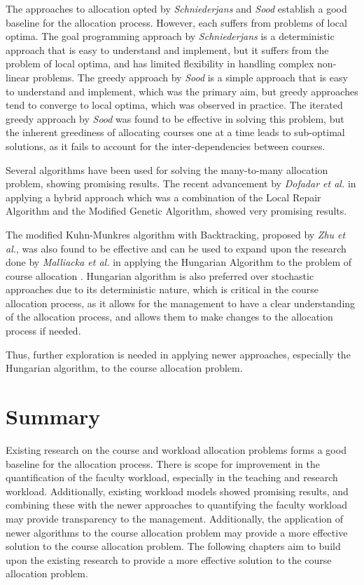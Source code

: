 The approaches to allocation opted by \textit{Schniederjans} and \textit{Sood} establish a good baseline for the allocation process. However, each suffers from problems of local optima. The goal programming approach by \textit{Schniederjans} is a deterministic approach that is easy to understand and implement, but it suffers from the problem of local optima, and has limited flexibility in handling complex non-linear problems. The greedy approach by \textit{Sood} is a simple approach that is easy to understand and implement, which was the primary aim, but greedy approaches tend to converge to local optima, which was observed in practice. The iterated greedy approach by \textit{Sood} was found to be effective in solving this problem, but the inherent greediness of allocating courses one at a time leads to sub-optimal solutions, as it fails to account for the inter-dependencies between courses.

Several algorithms have been used for solving the many-to-many allocation problem, showing promising results. The recent advancement by \textit{Dofadar et al.} in applying a hybrid approach which was a combination of the Local Repair Algorithm and the Modified Genetic Algorithm, showed very promising results.

The modified Kuhn-Munkres algorithm with Backtracking, proposed by \textit{Zhu et al.}, was also found to be effective and can be used to expand upon the research done by \textit{Malliacka et al.} in applying the Hungarian Algorithm to the problem of course allocation \cite{dofadar2021hybrid, zhu2016solving, mallicka2021claps}. Hungarian algorithm is also preferred over stochastic approaches due to its deterministic nature, which is critical in the course allocation process, as it allows for the management to have a clear understanding of the allocation process, and allows them to make changes to the allocation process if needed.

Thus, further exploration is needed in applying newer approaches, especially the Hungarian algorithm, to the course allocation problem.

\section{Summary}

Existing research on the course and workload allocation problems forms a good baseline for the allocation process. There is scope for improvement in the quantification of the faculty workload, especially in the teaching and research workload. Additionally, existing workload models showed promising results, and combining these with the newer approaches to quantifying the faculty workload may provide transparency to the management. Additionally, the application of newer algorithms to the course allocation problem may provide a more effective solution to the course allocation problem. The following chapters aim to build upon the existing research to provide a more effective solution to the course allocation problem.
